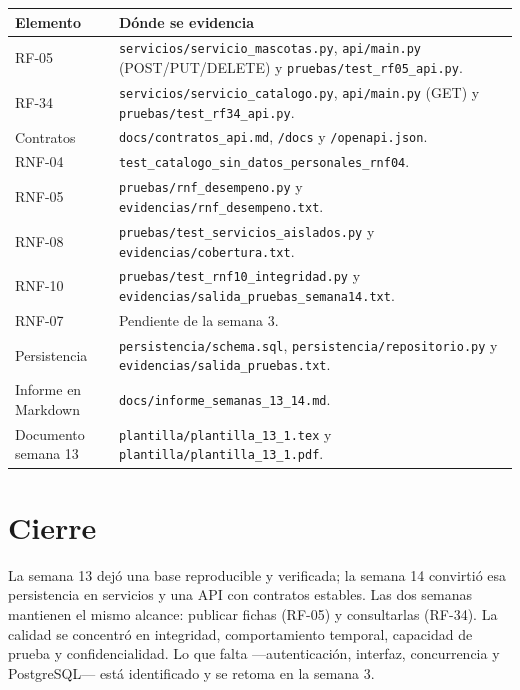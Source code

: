 \documentclass[11pt,a4paper]{article}
\newcommand{\code}[1]{\texttt{#1}}
\newcommand{\thead}[1]{\textbf{#1}}
\begin{document}
{\footnotesize
\begin{tabularx}{\linewidth}{@{}V{0.6}V{1.4}@{}}
\toprule
\thead{Elemento} & \thead{Dónde se evidencia} \\ \midrule
RF-05 & \code{servicios/servicio\_mascotas.py}, \code{api/main.py}
(POST/PUT/DELETE) y \code{pruebas/test\_rf05\_api.py}. \\
RF-34 & \code{servicios/servicio\_catalogo.py}, \code{api/main.py} (GET) y
\code{pruebas/test\_rf34\_api.py}. \\
Contratos & \code{docs/contratos\_api.md}, \code{/docs} y
\code{/openapi.json}. \\
RNF-04 & \code{test\_catalogo\_sin\_datos\_personales\_rnf04}. \\
RNF-05 & \code{pruebas/rnf\_desempeno.py} y
\code{evidencias/rnf\_desempeno.txt}. \\
RNF-08 & \code{pruebas/test\_servicios\_aislados.py} y
\code{evidencias/cobertura.txt}. \\
RNF-10 & \code{pruebas/test\_rnf10\_integridad.py} y
\code{evidencias/salida\_pruebas\_semana14.txt}. \\
RNF-07 & Pendiente de la semana 3. \\
Persistencia & \code{persistencia/schema.sql},
\code{persistencia/repositorio.py} y \code{evidencias/salida\_pruebas.txt}. \\
Informe en Markdown & \code{docs/informe\_semanas\_13\_14.md}. \\
Documento semana 13 & \code{plantilla/plantilla\_13\_1.tex} y
\code{plantilla/plantilla\_13\_1.pdf}. \\
\bottomrule
\end{tabularx}
}

\section*{Cierre}

La semana 13 dejó una base reproducible y verificada; la semana 14 convirtió esa
persistencia en servicios y una API con contratos estables. Las dos semanas
mantienen el mismo alcance: publicar fichas (RF-05) y consultarlas (RF-34). La
calidad se concentró en integridad, comportamiento temporal, capacidad de prueba
y confidencialidad. Lo que falta ---autenticación, interfaz, concurrencia y
PostgreSQL--- está identificado y se retoma en la semana 3.
\end{document}
